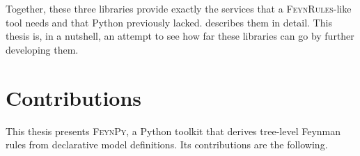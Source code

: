 Together, these three libraries provide exactly the services that a \textsc{FeynRules}-like tool needs and that Python previously lacked.
 describes them in detail. This thesis is, in a nutshell, an attempt to see how far these libraries can go by further developing them.

\section{Contributions}
\label{sec:intro-contributions}

This thesis presents \textsc{FeynPy}, a Python toolkit that derives
tree-level Feynman rules from declarative model definitions. Its
contributions are the following.

